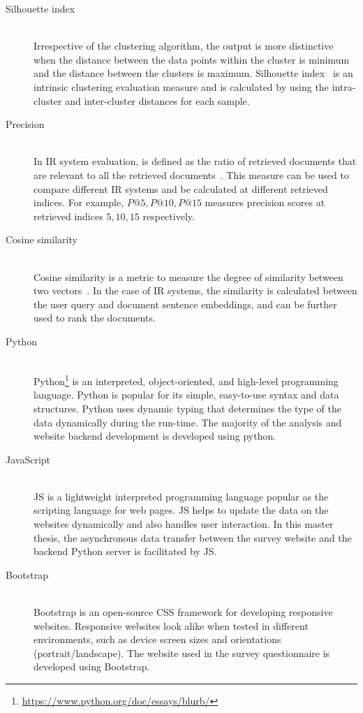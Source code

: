 \begin{description}
	\item[Silhouette index] \hfill \\ 
	Irrespective of the clustering algorithm, the output is more distinctive when the distance between the data points within the cluster is minimum and the distance between the clusters is maximum. Silhouette index~\cite{rousseeuw1987silhouettes} is an intrinsic clustering evaluation measure and is calculated by using the intra-cluster and inter-cluster distances for each sample.
	
	\item[Precision] \hfill \\     In IR system evaluation,  is defined as the ratio of retrieved documents that are relevant to all the retrieved documents~\cite{zuva2012evaluation}. This measure can be used to compare different IR systems and be calculated at different retrieved indices. For example, $P@5, P@10, P@15$ measures precision scores at retrieved indices $5, 10, 15$ respectively.
	
	
	\item[Cosine similarity] \hfill \\     Cosine similarity is a metric to measure the degree of similarity between two vectors~\cite{lahitani2016cosine}. In the case of IR systems, the similarity is calculated between the user query and document sentence embeddings, and can be further used to rank the documents.
	
	
	 \item[Python] \hfill \\ Python\footnote{\url{https://www.python.org/doc/essays/blurb/}} is an interpreted, object-oriented, and high-level programming language.
	Python is popular for its simple, easy-to-use syntax and data structures. Python uses
	dynamic typing that determines the type of the data dynamically during the run-time.
	The majority of the analysis and website backend development is developed using python.
	
	\item[JavaScript] \hfill \\ \ac{JS} is a lightweight interpreted programming language popular as the scripting language for web pages\cite{mozillaWhatJavaScript}. \ac{JS} helps to update
	the data on the websites dynamically and also handles user interaction. In this master thesis, the
	asynchronous data transfer between the survey website and the backend Python server
	is facilitated by \ac{JS}.
	
	\item[Bootstrap] \hfill \\ Bootstrap is an open-source \ac{CSS} framework for developing responsive websites\cite{simplilearnWhatBootstrap}.
	Responsive websites look alike when tested in different environments, such as device screen sizes and orientations (portrait/landscape). The website
	used in the survey questionnaire is developed using Bootstrap.
	

\end{description}
